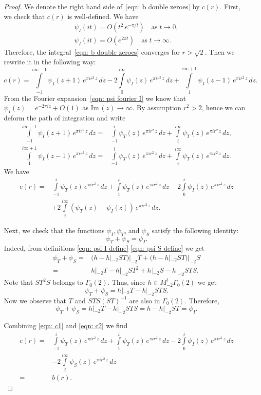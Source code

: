 \documentclass{scrartcl}
\renewcommand{\Im}{\mathrm{Im}\,}
\begin{document}
\begin{proof}
We denote the right hand side of~\eqref{eqn: b double zeroes} by $c(r)$. First, we check that $c(r)$ is well-defined. We have
\begin{align*}
\psi_I(it)=O(t^{2}\,e^{-\pi/t})\quad\mbox{as}\;t\to 0,\\
 \psi_I(it)=O(e^{2\pi t})\quad\mbox{as}\;t\to\infty.
\end{align*}
Therefore, the integral~\eqref{eqn: b double zeroes} converges for $r>\sqrt{2}$.
Then we rewrite it in the following way:
$$c(r)=\int\limits_{-1}^{i\infty-1}\psi_I(z+1)\,e^{\pi i r^2 \,z}\,dz-2\int\limits_{0}^{i\infty}\psi_I(z)\,e^{\pi i r^2 \,z}\,dz+
\int\limits_{1}^{i\infty+1}\psi_I(z-1)\,e^{\pi i r^2 \,z}\,dz.$$
From the Fourier expansion~\eqref{eqn: psi fourier I} we know that $\psi_I(z)=e^{-2\pi i z}+O(1)$ as $\Im(z)\to\infty$.
By assumption $r^2>2$, hence we can deform the path of integration and write
\begin{align}\label{eqn: inside proof 1}
\int\limits_{-1}^{i\infty-1}\psi_I(z+1)\,e^{\pi i r^2 \,z}\,dz=&
\int\limits_{-1}^{i}\psi_T(z)\,e^{\pi i r^2 \,z}\,dz+\int\limits_{i}^{i\infty}\psi_T(z)\,e^{\pi i r^2 \,z}\,dz,\\
\int\limits_{1}^{i\infty+1}\psi_I(z-1)\,e^{\pi i r^2 \,z}\,dz=&
\int\limits_{-1}^{i}\psi_T(z)\,e^{\pi i r^2 \,z}\,dz+\int\limits_{i}^{i\infty}\psi_T(z)\,e^{\pi i r^2 \,z}\,dz.
\end{align}
We have
\begin{align}\label{eqn: c1}c(r)=&\int\limits_{-1}^{i}\psi_T(z)\,e^{\pi i r^2 \,z}\,dz+\int\limits_{1}^{i}\psi_T(z)\,e^{\pi i r^2 \,z}\,dz
-2\int\limits_{0}^{i}\psi_I(z)\,e^{\pi i r^2 \,z}\,dz\\
&+2\int\limits_{i}^{i\infty}(\psi_T(z)-\psi_I(z))\,e^{\pi i r^2 \,z}\,dz.\nonumber
 \end{align}


 Next, we check that the functions $\psi_I,\psi_T$, and $\psi_S$ satisfy the following identity:
\begin{equation}\label{eqn: c2}\psi_T+\psi_S=\psi_I.\end{equation}
Indeed, from definitions \eqref{eqn: psi I define}-\eqref{eqn: psi S define} we get
\begin{align*}\psi_T+\psi_S=&(h-h|_{-2}ST)|_{-2}T+(h-h|_{-2}ST)|_{-2}S\\
=&h|_{-2}T-h|_{-2}ST^2+h|_{-2}S-h|_{-2}STS.\end{align*}
Note that $ST^2S$ belongs to $\Gamma_0(2)$. Thus, since $h\in M^!_{-2}\Gamma_0(2)$ we get
$$\psi_T+\psi_S=h|_{-2}T-h|_{-2}STS. $$
Now we observe that $T$ and $STS(ST)^{-1}$ are also in $\Gamma_0(2)$. Therefore,
$$\psi_T+\psi_S=h|_{-2}T-h|_{-2}STS=h-h|_{-2}ST=\psi_I.$$

Combining \eqref{eqn: c1} and \eqref{eqn: c2} we find
\begin{align*}c(r)=&\int\limits_{-1}^{i}\psi_T(z)\,e^{\pi i r^2 \,z}\,dz+\int\limits_{1}^{i}\psi_T(z)\,e^{\pi i r^2 \,z}\,dz
-2\int\limits_{0}^{i}\psi_I(z)\,e^{\pi i r^2 \,z}\,dz\\
&-2\int\limits_{i}^{i\infty}\psi_S(z)\,e^{\pi i r^2 \,z}\,dz\\
=&b(r).
 \end{align*}
\end{proof}
\end{document}

